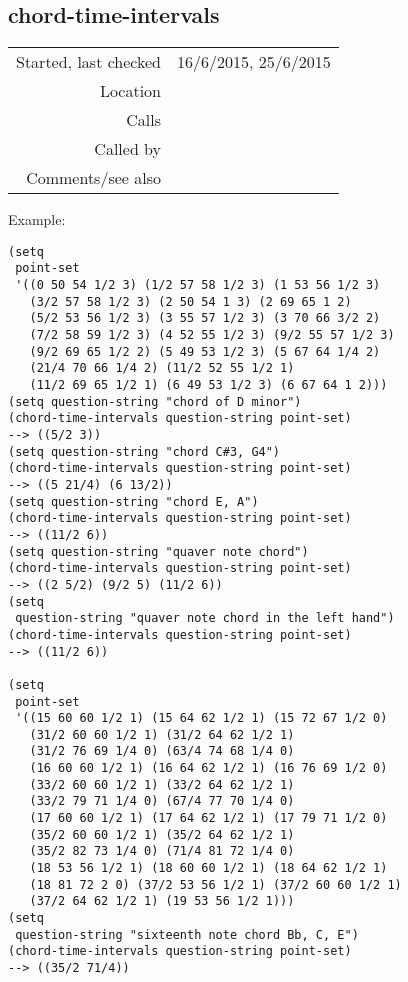 \subsection*{chord-time-intervals}\label{fun:chord-time-intervals}

\vspace{0.3cm}
\begin{tabular}{r|p{8cm}}
Started, last checked & 16/6/2015, 25/6/2015 \\
Location & \nameref{sec:chord-labelling} \\
Calls & \\
Called by & \nameref{fun:time-intervals-for-question-elements-Jun2015} \\
Comments/see also &
\end{tabular}

\vspace{0.5cm}
\noindent Example:
\begin{verbatim}
(setq
 point-set
 '((0 50 54 1/2 3) (1/2 57 58 1/2 3) (1 53 56 1/2 3)
   (3/2 57 58 1/2 3) (2 50 54 1 3) (2 69 65 1 2)
   (5/2 53 56 1/2 3) (3 55 57 1/2 3) (3 70 66 3/2 2)
   (7/2 58 59 1/2 3) (4 52 55 1/2 3) (9/2 55 57 1/2 3)
   (9/2 69 65 1/2 2) (5 49 53 1/2 3) (5 67 64 1/4 2)
   (21/4 70 66 1/4 2) (11/2 52 55 1/2 1)
   (11/2 69 65 1/2 1) (6 49 53 1/2 3) (6 67 64 1 2)))
(setq question-string "chord of D minor")
(chord-time-intervals question-string point-set)
--> ((5/2 3))
(setq question-string "chord C#3, G4")
(chord-time-intervals question-string point-set)
--> ((5 21/4) (6 13/2))
(setq question-string "chord E, A")
(chord-time-intervals question-string point-set)
--> ((11/2 6))
(setq question-string "quaver note chord")
(chord-time-intervals question-string point-set)
--> ((2 5/2) (9/2 5) (11/2 6))
(setq
 question-string "quaver note chord in the left hand")
(chord-time-intervals question-string point-set)
--> ((11/2 6))

(setq
 point-set
 '((15 60 60 1/2 1) (15 64 62 1/2 1) (15 72 67 1/2 0)
   (31/2 60 60 1/2 1) (31/2 64 62 1/2 1)
   (31/2 76 69 1/4 0) (63/4 74 68 1/4 0)
   (16 60 60 1/2 1) (16 64 62 1/2 1) (16 76 69 1/2 0)
   (33/2 60 60 1/2 1) (33/2 64 62 1/2 1)
   (33/2 79 71 1/4 0) (67/4 77 70 1/4 0)
   (17 60 60 1/2 1) (17 64 62 1/2 1) (17 79 71 1/2 0)
   (35/2 60 60 1/2 1) (35/2 64 62 1/2 1)
   (35/2 82 73 1/4 0) (71/4 81 72 1/4 0)
   (18 53 56 1/2 1) (18 60 60 1/2 1) (18 64 62 1/2 1)
   (18 81 72 2 0) (37/2 53 56 1/2 1) (37/2 60 60 1/2 1)
   (37/2 64 62 1/2 1) (19 53 56 1/2 1)))
(setq
 question-string "sixteenth note chord Bb, C, E")
(chord-time-intervals question-string point-set)
--> ((35/2 71/4))
\end{verbatim}

